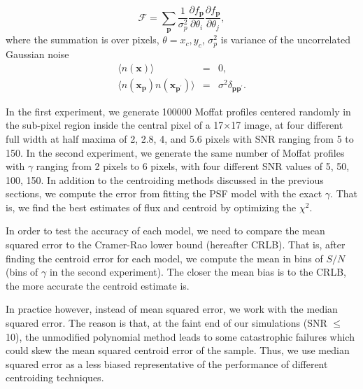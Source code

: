 \documentclass[12pt, preprint]{aastex}
\newcommand{\beq}{\begin{equation}}
\newcommand{\eeq}{\end{equation}}
\begin{document}
\beq
  \mathcal{F} = \sum_{\mathbf{p}}\frac{1}{\sigma_{p}^{2}}
                \frac{\partial f_{\mathbf{p}}}{\partial \theta_{i}}\frac{\partial f_{\mathbf{p}}}{\partial \theta_{j}},
\eeq
where the summation is over pixels, $\theta={x_{c},y_{c}}$, $\sigma_{p}^{2}$ is variance
of the uncorrelated Gaussian noise
\begin{eqnarray}
\langle n(\mathbf{x}) \rangle &=& 0, \\
\langle n(\mathbf{x_{p}})n(\mathbf{x_{p^{\prime}}}) \rangle &=& \sigma^{2}\delta_{\mathbf{p}\mathbf{p}^{\prime}}. 
\end{eqnarray}





In the first experiment, we generate 100000 Moffat profiles centered randomly in the sub-pixel region inside the central pixel of a 17$\times$17 image, at four different full width at half maxima of 2, 2.8, 4, and 5.6 pixels with SNR ranging from 5 to 150. In the second experiment, we generate the same number of Moffat profiles with $\gamma$ ranging from 2 pixels to 6 pixels, with four different SNR values of 5, 50, 100, 150.
In addition to the centroiding methods discussed in the previous sections, we compute the error from fitting the PSF model with the exact $\gamma$. That is, we find the best estimates of flux and centroid by optimizing the $\chi^{2}$. 

In order to test the accuracy of each model, we need to compare
the mean squared error to the Cramer-Rao lower bound (hereafter CRLB).
That is, after finding the centroid error for each model, we
compute the mean in bins of $S/N$ (bins of $\gamma$ in the second experiment).
The closer the mean bias is to the CRLB, the more accurate the centroid estimate is.

In practice however, instead of mean squared error, we work with the median squared error.
The reason is that, at the faint end of our simulations (SNR $\leq$ 10),
the unmodified polynomial method leads to some catastrophic failures which
could skew the mean squared centroid error of the sample.
Thus, we use median squared error as a less biased representative
of the performance of different centroiding techniques. 
 
\end{document}

